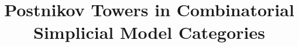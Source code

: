 



\usepackage{subfiles}


\title{Postnikov Towers in Combinatorial Simplicial Model Categories} \date{}
\maketitle

{\footnotesize
  \tableofcontents
}





\printbibliography

\listoftodos

